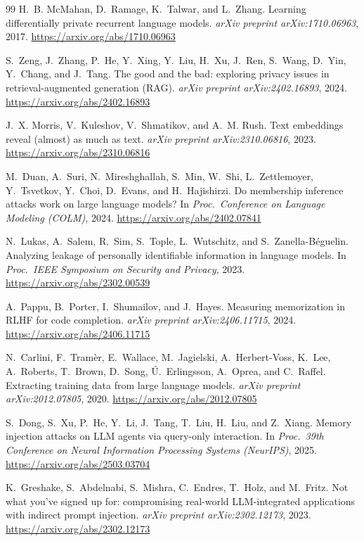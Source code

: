 \documentclass[11pt,a4paper]{article}
\theoremstyle{definition}
\begin{document}
\begin{thebibliography}{99}
 H.~B. McMahan, D.~Ramage, K.~Talwar, and L.~Zhang. Learning differentially
private recurrent language models. \emph{arXiv preprint arXiv:1710.06963}, 2017.
\url{https://arxiv.org/abs/1710.06963}

 S.~Zeng, J.~Zhang, P.~He, Y.~Xing, Y.~Liu, H.~Xu, J.~Ren, S.~Wang, D.~Yin,
Y.~Chang, and J.~Tang. The good and the bad: exploring privacy issues in retrieval-augmented
generation (RAG). \emph{arXiv preprint arXiv:2402.16893}, 2024.
\url{https://arxiv.org/abs/2402.16893}

 J.~X. Morris, V.~Kuleshov, V.~Shmatikov, and A.~M. Rush. Text
embeddings reveal (almost) as much as text. \emph{arXiv preprint arXiv:2310.06816}, 2023.
\url{https://arxiv.org/abs/2310.06816}

 M.~Duan, A.~Suri, N.~Mireshghallah, S.~Min, W.~Shi, L.~Zettlemoyer,
Y.~Tsvetkov, Y.~Choi, D.~Evans, and H.~Hajishirzi. Do membership inference attacks work on large
language models? In \emph{Proc.\ Conference on Language Modeling (COLM)}, 2024.
\url{https://arxiv.org/abs/2402.07841}

 N.~Lukas, A.~Salem, R.~Sim, S.~Tople, L.~Wutschitz, and
S.~Zanella-B\'eguelin. Analyzing leakage of personally identifiable information in language
models. In \emph{Proc.\ IEEE Symposium on Security and Privacy}, 2023.
\url{https://arxiv.org/abs/2302.00539}

 A.~Pappu, B.~Porter, I.~Shumailov, and J.~Hayes. Measuring memorization
in RLHF for code completion. \emph{arXiv preprint arXiv:2406.11715}, 2024.
\url{https://arxiv.org/abs/2406.11715}

 N.~Carlini, F.~Tram\`er, E.~Wallace, M.~Jagielski,
A.~Herbert-Voss, K.~Lee, A.~Roberts, T.~Brown, D.~Song, \'U.~Erlingsson, A.~Oprea, and C.~Raffel.
Extracting training data from large language models. \emph{arXiv preprint arXiv:2012.07805},
2020. \url{https://arxiv.org/abs/2012.07805}

 S.~Dong, S.~Xu, P.~He, Y.~Li, J.~Tang, T.~Liu, H.~Liu, and Z.~Xiang.
Memory injection attacks on LLM agents via query-only interaction. In \emph{Proc.\ 39th Conference on
Neural Information Processing Systems (NeurIPS)}, 2025. \url{https://arxiv.org/abs/2503.03704}

 K.~Greshake, S.~Abdelnabi, S.~Mishra, C.~Endres, T.~Holz, and
M.~Fritz. Not what you've signed up for: compromising real-world LLM-integrated applications
with indirect prompt injection. \emph{arXiv preprint arXiv:2302.12173}, 2023.
\url{https://arxiv.org/abs/2302.12173}


\end{thebibliography}
\end{document}
